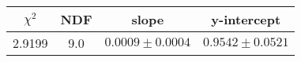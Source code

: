 \begin{tabular}{|c|c|c|c|}

\hline
$\chi^{2}$ & NDF & slope & y-intercept  \\
\hline
2.9199 & 9.0 & $0.0009\pm0.0004$ & $0.9542\pm0.0521$ \\
\hline

\end{tabular}